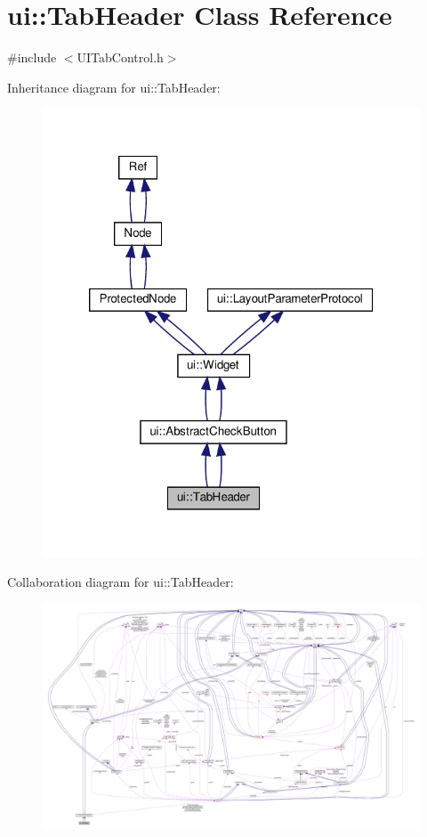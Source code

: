 \hypertarget{classui_1_1TabHeader}{}\section{ui\+:\+:Tab\+Header Class Reference}
\label{classui_1_1TabHeader}


{\ttfamily \#include $<$U\+I\+Tab\+Control.\+h$>$}



Inheritance diagram for ui\+:\+:Tab\+Header\+:
\nopagebreak
\begin{figure}[H]
\begin{center}
\leavevmode
\includegraphics[width=320pt]{classui_1_1TabHeader__inherit__graph}
\end{center}
\end{figure}


Collaboration diagram for ui\+:\+:Tab\+Header\+:
\nopagebreak
\begin{figure}[H]
\begin{center}
\leavevmode
\includegraphics[width=350pt]{classui_1_1TabHeader__coll__graph}
\end{center}
\end{figure}
